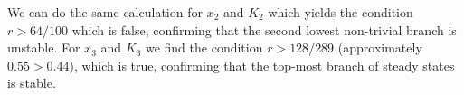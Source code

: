 We can do the same calculation for $x_2$ and $K_2$ which yields the condition $r>64/100$ which is false, confirming that the second lowest non-trivial branch is unstable. For $x_3$ and $K_3$ we find the condition $r>128/289$ (approximately $0.55>0.44$), which is true, confirming that the top-most branch of steady states is stable.